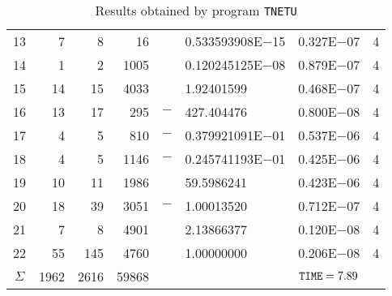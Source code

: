 \documentclass{esub2acm}
\begin{document}
\begin{table}
\begin{tabular}{c|rrrr@{}lcc}
13  &   7   &   8   &   16  &       &   0.533593908E$-$15   &   0.327E$-$07 &   4   \\
14  &   1   &   2   &   1005    &       &   0.120245125E$-$08   &   0.879E$-$07 &   4   \\
15  &   14  &   15  &   4033    &       &   1.92401599  &   0.468E$-$07 &   4   \\
16  &   13  &   17  &   295 &   $-$ &   427.404476  &   0.800E$-$08 &   4   \\
17  &   4   &   5   &   810 &   $-$ &   0.379921091E$-$01   &   0.537E$-$06 &   4   \\
18  &   4   &   5   &   1146    &   $-$ &   0.245741193E$-$01   &   0.425E$-$06 &   4   \\
19  &   10  &   11  &   1986    &       &   59.5986241  &   0.423E$-$06 &   4   \\
20  &   18  &   39  &   3051    &   $-$ &   1.00013520  &   0.712E$-$07 &   4   \\
21  &   7   &   8   &   4901    &       &   2.13866377  &   0.120E$-$08 &   4   \\
22  &   55  &   145 &   4760    &       &   1.00000000  &   0.206E$-$08 &   4   \\ \hline
$\Sigma$\rule[-2pt]{0pt}{12pt}  &   1962    &   2616    &   59868   &       &       &   ${\tt TIME} = 7.89$ &       \\ \hline
\end{tabular}
\caption{Results obtained by program {\tt TNETU}}
\label{tnetu}
\end{table}
\end{document}
